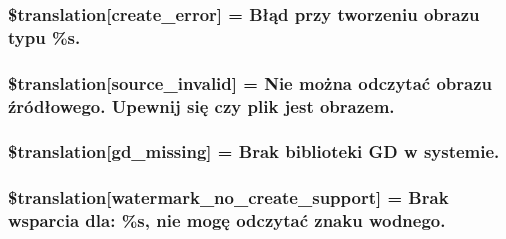 \subsubsection[{\$translation}]{\setlength{\rightskip}{0pt plus 5cm}\$translation\mbox{[}\textquotesingle{}create\+\_\+error\textquotesingle{}\mbox{]} = \textquotesingle{}Błąd przy tworzeniu obrazu typu \%s.\textquotesingle{}}\label{class_8upload_8pl___p_l_8php_a53013ce9255c4e1849098ddd9fdb2b3f}
\hypertarget{class_8upload_8pl___p_l_8php_a6ab0a660b457eaf2d3434b225449fdd6}{}
\subsubsection[{\$translation}]{\setlength{\rightskip}{0pt plus 5cm}\$translation\mbox{[}\textquotesingle{}source\+\_\+invalid\textquotesingle{}\mbox{]} = \textquotesingle{}Nie można odczytać obrazu źródłowego. Upewnij się czy plik jest obrazem.\textquotesingle{}}\label{class_8upload_8pl___p_l_8php_a6ab0a660b457eaf2d3434b225449fdd6}
\hypertarget{class_8upload_8pl___p_l_8php_a7f3dfcc0db4bbc0f2e7210c439798e56}{}
\subsubsection[{\$translation}]{\setlength{\rightskip}{0pt plus 5cm}\$translation\mbox{[}\textquotesingle{}gd\+\_\+missing\textquotesingle{}\mbox{]} = \textquotesingle{}Brak biblioteki G\+D w systemie.\textquotesingle{}}\label{class_8upload_8pl___p_l_8php_a7f3dfcc0db4bbc0f2e7210c439798e56}
\hypertarget{class_8upload_8pl___p_l_8php_a82d5853430ab72dc1f9799ec36144cc6}{}
\subsubsection[{\$translation}]{\setlength{\rightskip}{0pt plus 5cm}\$translation\mbox{[}\textquotesingle{}watermark\+\_\+no\+\_\+create\+\_\+support\textquotesingle{}\mbox{]} = \textquotesingle{}Brak wsparcia dla\+: \%s, nie mogę odczytać znaku wodnego.\textquotesingle{}}\label{class_8upload_8pl___p_l_8php_a82d5853430ab72dc1f9799ec36144cc6}
\hypertarget{class_8upload_8pl___p_l_8php_aabca0b65dadbc6184415c16375f284ca}{}

